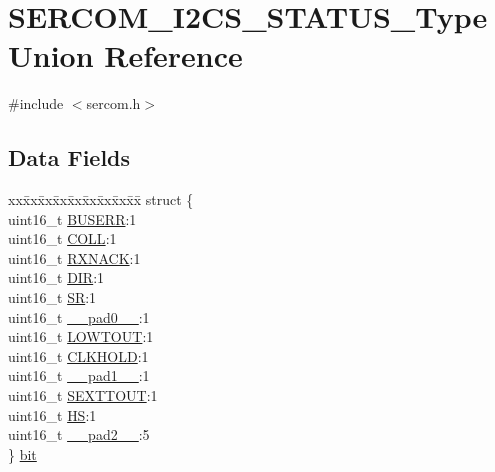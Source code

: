 \hypertarget{union_s_e_r_c_o_m___i2_c_s___s_t_a_t_u_s___type}{}\section{S\+E\+R\+C\+O\+M\+\_\+\+I2\+C\+S\+\_\+\+S\+T\+A\+T\+U\+S\+\_\+\+Type Union Reference}
\label{union_s_e_r_c_o_m___i2_c_s___s_t_a_t_u_s___type}


{\ttfamily \#include $<$sercom.\+h$>$}

\subsection*{Data Fields}
\begin{DoxyCompactItemize}
\item 
\begin{tabbing}
xx\=xx\=xx\=xx\=xx\=xx\=xx\=xx\=xx\=\kill
struct \{\\
\>uint16\_t \mbox{\hyperlink{union_s_e_r_c_o_m___i2_c_s___s_t_a_t_u_s___type_a44b2183b4c67c3dca877a59031b8c103}{BUSERR}}:1\\
\>uint16\_t \mbox{\hyperlink{union_s_e_r_c_o_m___i2_c_s___s_t_a_t_u_s___type_ad5762710d2f2bd7bd5fb5d427e646c94}{COLL}}:1\\
\>uint16\_t \mbox{\hyperlink{union_s_e_r_c_o_m___i2_c_s___s_t_a_t_u_s___type_a8f68c21e9cd41cd315423290a05d0b98}{RXNACK}}:1\\
\>uint16\_t \mbox{\hyperlink{union_s_e_r_c_o_m___i2_c_s___s_t_a_t_u_s___type_af86675a9708f6f4e82153f02a7afe492}{DIR}}:1\\
\>uint16\_t \mbox{\hyperlink{union_s_e_r_c_o_m___i2_c_s___s_t_a_t_u_s___type_a6e067b008b987d04b932fbbf60ae5e88}{SR}}:1\\
\>uint16\_t \mbox{\hyperlink{union_s_e_r_c_o_m___i2_c_s___s_t_a_t_u_s___type_a77132c2c26a75f5b8751b235cda23828}{\_\_pad0\_\_}}:1\\
\>uint16\_t \mbox{\hyperlink{union_s_e_r_c_o_m___i2_c_s___s_t_a_t_u_s___type_a38e12ce9808854d1db0794cc5599ab2f}{LOWTOUT}}:1\\
\>uint16\_t \mbox{\hyperlink{union_s_e_r_c_o_m___i2_c_s___s_t_a_t_u_s___type_a1f19f733cd52fee28607cc02957db2a5}{CLKHOLD}}:1\\
\>uint16\_t \mbox{\hyperlink{union_s_e_r_c_o_m___i2_c_s___s_t_a_t_u_s___type_ab72e3a1f2f7db8695c60c658f5a0f11a}{\_\_pad1\_\_}}:1\\
\>uint16\_t \mbox{\hyperlink{union_s_e_r_c_o_m___i2_c_s___s_t_a_t_u_s___type_a369d5cf43d681c76345e0e85228bf532}{SEXTTOUT}}:1\\
\>uint16\_t \mbox{\hyperlink{union_s_e_r_c_o_m___i2_c_s___s_t_a_t_u_s___type_a1715bb5287f899407176f899a3129e3d}{HS}}:1\\
\>uint16\_t \mbox{\hyperlink{union_s_e_r_c_o_m___i2_c_s___s_t_a_t_u_s___type_a82701c5ec65a0fca9a84d8edc46a8192}{\_\_pad2\_\_}}:5\\
\} \mbox{\hyperlink{union_s_e_r_c_o_m___i2_c_s___s_t_a_t_u_s___type_a3249764c48f13c2c7bd2149fa336ceef}{bit}}\\


\end{tabbing}
\end{DoxyCompactItemize}
